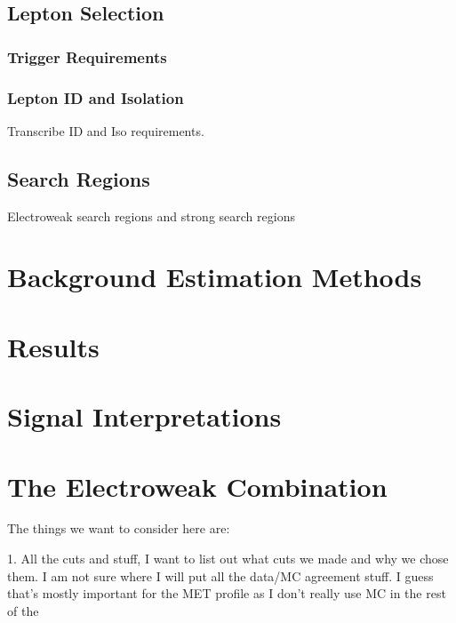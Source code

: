   \subsection{Lepton Selection}

    \subsubsection{Trigger Requirements}

    \subsubsection{Lepton ID and Isolation}
    Transcribe ID and Iso requirements.

  \subsection{Search Regions}
    Electroweak search regions and strong search regions

\section{Background Estimation Methods}

\section{Results}

\section{Signal Interpretations}

\section{The Electroweak Combination}

The things we want to consider here are: 

  1. All the cuts and stuff, I want to list out what cuts we made and why we chose them. I am not sure where I will put all the data/MC agreement stuff. I guess that's mostly important for the MET profile as I don't really use MC in the rest of the
